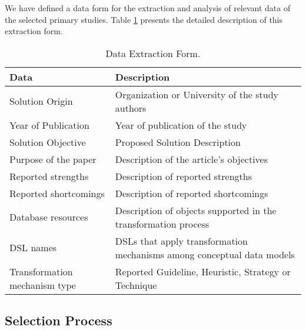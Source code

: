 We have defined a data form for the extraction and analysis of relevant data of the selected primary studies.
Table \ref{tab:DataExtractionForm} presents the detailed description of this extraction form.

\begin{table}[!htb]
    \centering
    \scriptsize
    \caption{Data Extraction Form.}
    \label{tab:DataExtractionForm}
    \begin{tabular}{p{5cm}|p{10cm}}
    \bottomrule
    \rowcolor[HTML]{C0C0C0} 
    \textbf{Data} & \textbf{Description} \\
    \hline
    Solution Origin & Organization or University of the study authors
    \\
    Year of Publication & Year of publication of the study
    \\
    Solution Objective & Proposed Solution Description
    \\
    Purpose of the paper & Description of the article's objectives
    \\
    Reported strengths & Description of reported strengths
    \\
    Reported shortcomings & Description of reported shortcomings
    \\
    Database resources & Description of objects supported in the transformation process
    \\
    DSL names & DSLs that apply transformation mechanisms among conceptual data models
    \\
    Transformation mechanism type & Reported Guideline, Heuristic, Strategy or Technique
    \\
    \toprule
    \end{tabular}
\end{table}

\subsection{Selection Process} \label{ssec_slm:selectionProcess}


